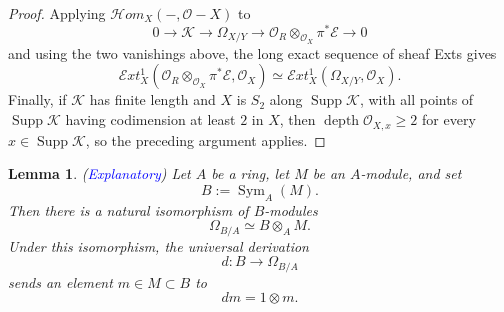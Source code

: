 \documentclass[11pt,twoside]{amsart}
\theoremstyle{plain}
\numberwithin{equation}{section}
\newtheorem{lemma}[theorem]{Lemma}
\theoremstyle{definition}
\begin{document}
\begin{proof}
Applying $\mathcal{H}om_X(-,\mathcal{O}-X)$ to
$$
0\longrightarrow\mathcal{K}\longrightarrow\Omega_{X/Y}
\longrightarrow
\mathcal{O}_R\otimes_{\mathcal{O}_X}\pi^*\mathcal{E}
\longrightarrow 0
$$
and using the two vanishings above, the long exact sequence of sheaf Exts gives
$$
\mathcal{E}xt_X^1
\left(
\mathcal{O}_R\otimes_{\mathcal{O}_X}\pi^*\mathcal{E},
\mathcal{O}_X
\right)
\simeq
\mathcal{E}xt_X^1(\Omega_{X/Y},\mathcal{O}_X).
$$
Finally, if $\mathcal{K}$ has finite length and $X$ is $S_2$ along $\operatorname{Supp}\mathcal{K}$, with all points of $\operatorname{Supp}\mathcal{K}$ having codimension at least $2$ in $X$, then $\operatorname{depth}\mathcal{O}_{X,x}\geq 2$ for every $x\in\operatorname{Supp}\mathcal{K}$, so the preceding argument applies.
\end{proof}

\begin{lemma}\label{lem:differentials-symmetric-algebra}(\textcolor{blue}{Explanatory})
Let $A$ be a ring, let $M$ be an $A$-module, and set
$$
B:=\operatorname{Sym}_A(M).
$$
Then there is a natural isomorphism of $B$-modules
$$
\Omega_{B/A}\simeq B\otimes_A M.
$$
Under this isomorphism, the universal derivation
$$
d:B\longrightarrow \Omega_{B/A}
$$
sends an element $m\in M\subset B$ to
$$
dm=1\otimes m.
$$

\end{lemma}
\end{document}
